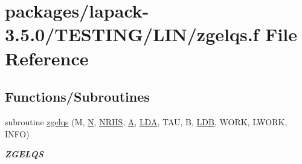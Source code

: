 \hypertarget{zgelqs_8f}{}\section{packages/lapack-\/3.5.0/\+T\+E\+S\+T\+I\+N\+G/\+L\+I\+N/zgelqs.f File Reference}
\label{zgelqs_8f}
\subsection*{Functions/\+Subroutines}
\begin{DoxyCompactItemize}
\item 
subroutine \hyperlink{group__complex16__lin_ga292b6c44a1408df4fe85df1923008cf6}{zgelqs} (M, \hyperlink{polmisc_8c_a0240ac851181b84ac374872dc5434ee4}{N}, \hyperlink{example__user_8c_aa0138da002ce2a90360df2f521eb3198}{N\+R\+H\+S}, \hyperlink{classA}{A}, \hyperlink{example__user_8c_ae946da542ce0db94dced19b2ecefd1aa}{L\+D\+A}, T\+A\+U, B, \hyperlink{example__user_8c_a50e90a7104df172b5a89a06c47fcca04}{L\+D\+B}, W\+O\+R\+K, L\+W\+O\+R\+K, I\+N\+F\+O)
\begin{DoxyCompactList}\small\item\em {\bfseries Z\+G\+E\+L\+Q\+S} \end{DoxyCompactList}\end{DoxyCompactItemize}
